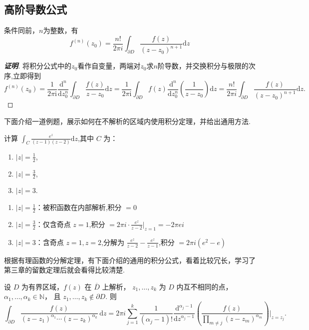 \documentclass[openany,oneside]{ctexbook}
\begin{document}
\subsection{高阶导数公式}
\begin{theorem}
条件同前，$n$为整数，有
\[
f^{(n)}(z_0) = \frac{n!}{2\pi i} \int_{\partial D} \frac{f(z)}{(z - z_0)^{n+1}}\mathrm{d}z 
\]
\end{theorem}
\begin{proof}[\textbf{证明}]
将积分公式中的$z_0$看作自变量，两端对$z_0$求$n$阶导数，并交换积分与极限的次序,立即得到
\[f^{(n)}(z_0) 
=\frac{1}{2\pi\mathrm{i}}\frac{\mathrm{d}^n}{\mathrm{d}z_0^n}\int_{\partial D}\frac{f(z)}{z - z_0}\mathrm{d}z
=\frac{1}{2\pi\mathrm{i}}\int_{\partial D}f(z)\frac{\mathrm{d}^n}{\mathrm{d}z_0^n}\left(\frac{1}{z - z_0}\right)\mathrm{d}z 
=\frac{n!}{2\pi i} \int_{\partial D} \frac{f(z)}{(z - z_0)^{n+1}}\mathrm{d}z.\]
\end{proof}
下面介绍一道例题，展示如何在不解析的区域内使用积分定理，并给出通用方法.
\begin{example}
计算 $\int_C \frac{e^z}{(z - 1)(z - 2)}\mathrm{d}z$,其中 $C$ 为：
\begin{enumerate}
  \item $|z| = \frac{1}{2}$,
  \item $|z| = \frac{3}{2}$,
  \item $|z| = 3$.
\end{enumerate}
\end{example}
\begin{solution}
\begin{enumerate}
  \item $|z| = \frac{1}{2}$：被积函数在内部解析,积分 $= 0$
  \item $|z| = \frac{3}{2}$：仅含奇点 $z=1$,积分 $= 2\pi i \cdot \frac{e^z}{z - 2}\bigg|_{z=1} = -2\pi e i$
  \item $|z| = 3$：含奇点 $z=1,z=2$,分解为 $\frac{e^z}{z - 2} - \frac{e^z}{z - 1}$,积分 $= 2\pi i (e^2 - e)$
\end{enumerate}
\end{solution}
根据有理函数的分解定理，有下面介绍的通用的积分公式，看着比较冗长，学习了第三章的留数定理后就会看得比较清楚.
\begin{corollary}
设 $D$ 为有界区域，$f(z)$ 在 $\overline D$ 上解析，
$z_1,\dots,z_k$ 为 $D$ 内互不相同的点，
$\alpha_1,\dots,\alpha_k\in\mathbb{N}$，
且 $z_1,\dots,z_k\notin\partial D$.
则
\[
\int_{\partial D}
\frac{f(z)}
{(z-z_1)^{\alpha_1}\cdots (z-z_k)^{\alpha_k}}
\,\mathrm{d}z
=
2\pi i
\sum_{j=1}^k
\frac{1}{(\alpha_j-1)!}
\frac{\mathrm{d}^{\alpha_j-1}}{\mathrm{d}z^{\alpha_j-1}}
\left(
\frac{f(z)}
{\prod_{m\ne j}(z-z_m)^{\alpha_m}}
\right)
\bigg|_{z=z_j}.\]
\end{corollary}
\end{document}
